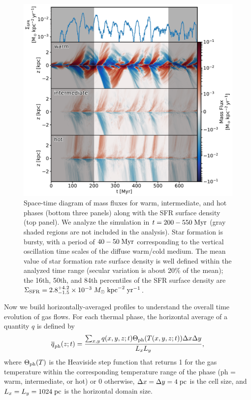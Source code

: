 \documentclass[twocolumn]{aastex62}
\newcommand\Msun{\; M_{\odot}}
\newcommand\yr{\; {\rm yr}}
\newcommand\Myr{\;{\rm Myr}}
\newcommand\pc{\;{\rm pc}}
\newcommand\kpc{\;{\rm kpc}}
\newcommand\sfrunit{\Msun \kpc^{-2} \yr^{-1}}
\begin{document}
\begin{figure}
    \centering
    \includegraphics[width=\textwidth]{Mflux_tz.pdf}
    \caption{Space-time diagram of mass fluxes for warm, intermediate, and hot phases (bottom three panels) along with the SFR surface density (top panel). We analyze the simulation in $t=200-550\Myr$ (gray shaded regions are not included in the analysis). Star formation is bursty, with a period of $40-50\Myr$ corresponding to the vertical oscillation time scales of the diffuse warm/cold medium. The mean value of star formation rate surface density is well defined within the analyzed time range (secular variation is about 20\% of the mean); the 16th, 50th, and 84th percentiles of the SFR surface density are $\Sigma_{\rm SFR} = 2.8^{+4.2}_{-1.5}\times10^{-3}\sfrunit$.}
    \label{fig:mflux}
\end{figure}

Now we build horizontally-averaged profiles to understand the overall time evolution of gas flows. For each thermal phase, the horizontal average of a quantity $q$ is defined by
\begin{equation}\label{eqn:havg}
\overline{q}_{\rm ph}(z;t) = \frac{\sum_{x,y} q(x,y,z;t)\Theta_{\rm ph}(T(x,y,z;t)) \Delta x \Delta y}{L_x L_y},
\end{equation}
where $\Theta_{\rm ph}(T)$ is the Heaviside step function that returns 1 for the gas temperature within the corresponding temperature range of the phase (ph = warm, intermediate, or hot) or 0 otherwise, $\Delta x = \Delta y =4\pc$ is the cell size, and $L_x=L_y=1024\pc$ is the horizontal domain size.
\end{document}
